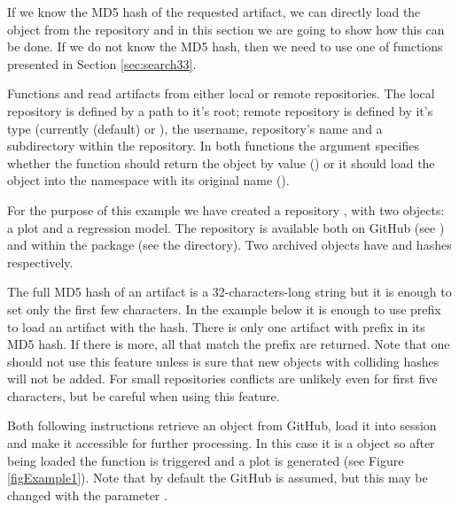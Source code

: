 \documentclass[nojss]{jss}\usepackage[]{graphicx}\usepackage[]{color}
\begin{document}
If we know the MD5 hash of the requested artifact, we can directly load the object from the repository and in this section we are going to show how this can be done. If we do not know the MD5 hash, then we need to use one of  functions presented in Section \ref{sec:search33}.

Functions  and  read artifacts from either local or remote repositories. The local repository is defined by a path to it's root; remote repository is defined by it's type (currently  (default) or ), the username, repository's name and a subdirectory within the repository. In both functions the argument  specifies whether the function should return the object by value () or it should load the object into the namespace with its original name ().

For the purpose of this example we have created a repository , with two objects: a plot and a regression model. 
The repository is available both on GitHub (see ) and within the  package (see the  directory). Two archived objects have  and  hashes respectively.

The full {MD5 hash} of an artifact is a 32-characters-long string but it is enough to set only the first few characters. In the example below it is enough to use  prefix to load an artifact with the  hash. There is only one artifact with prefix  in its MD5 hash. If there is more, all that match the prefix are returned. Note that one should not use this feature unless is sure that new objects with colliding hashes will not be added. For small repositories conflicts are unlikely even for first five characters, but be careful when using this feature.

Both following instructions retrieve an  object from GitHub, load it into   session and make it accessible for further processing. In this case it is a  object so after being loaded the  function is triggered and a plot is generated  (see Figure \ref{figExample1}). Note that by default the GitHub is assumed, but this may be changed with the parameter .
\end{document}
